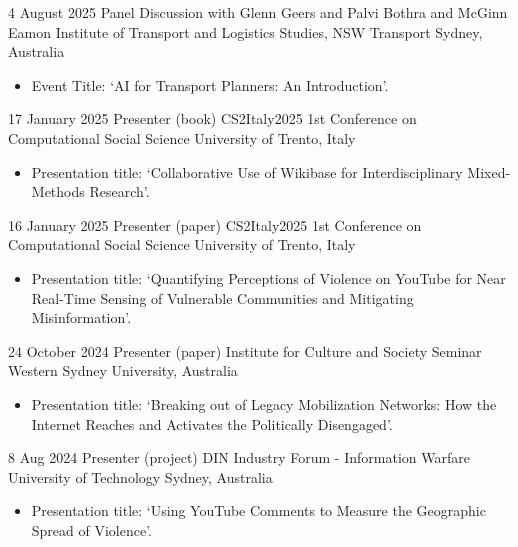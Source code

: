 \documentclass[12pt,a4paper,sans]{moderncv}
\begin{document}
\cventry
{4 August 2025}
{Panel Discussion with Glenn Geers and Palvi Bothra and  McGinn Eamon}
{Institute of Transport and Logistics Studies, NSW Transport}
{Sydney, Australia}
{}
{
\begin{itemize} %
\item {Event Title: `AI for Transport Planners: An Introduction'.}
\end{itemize}
}

\cventry
{17 January 2025}
{Presenter (book)}
{CS2Italy2025 1st Conference on Computational Social Science}
{University of Trento, Italy}
{}
      {
      \begin{itemize} %
        \item {Presentation title: `Collaborative Use of Wikibase for Interdisciplinary Mixed-Methods Research'. \href{https://fraba.github.io/presentation/2025-CS2ITALY/wikibase}{\faLink}}
      \end{itemize}
    }

\cventry
{16 January 2025}
{Presenter (paper)}
{CS2Italy2025 1st Conference on Computational Social Science}
{University of Trento, Italy}
{}
      {
      \begin{itemize} %
        \item {Presentation title: `Quantifying Perceptions of Violence on YouTube for Near Real-Time Sensing of Vulnerable Communities and Mitigating Misinformation'. \href{https://fraba.github.io/presentation/2025-CS2ITALY/youtube}{\faLink}}
      \end{itemize}
    }

\cventry
{24 October 2024}
{Presenter (paper)}
{Institute for Culture and Society Seminar}
{Western Sydney University, Australia}
{}
      {
      \begin{itemize} %
        \item {Presentation title: `Breaking out of Legacy Mobilization Networks: How the Internet Reaches and Activates the Politically Disengaged'. \href{https://fraba.github.io/presentation/2024-WSU}{\faLink}}
      \end{itemize}
    }

\cventry
{8 Aug 2024}
{Presenter (project)}
{DIN Industry Forum - Information Warfare}
{University of Technology Sydney, Australia}
{}
      {
      \begin{itemize} %
        \item {Presentation title: `Using YouTube Comments to Measure the Geographic Spread of Violence'. \href{https://fraba.github.io/presentation/2024-DIN}{\faLink}}
      \end{itemize}
    }
\end{document}
